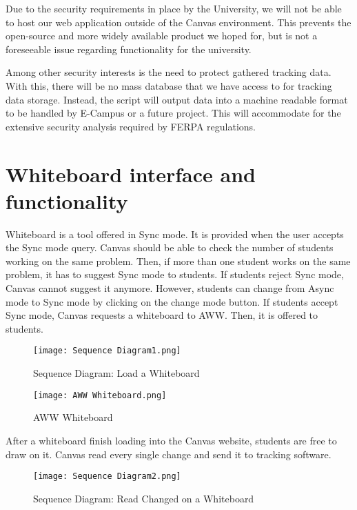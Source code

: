 \documentclass[onecolumn, draftclsnofoot,10pt, compsoc]{IEEEtran}
\begin{document}
	Due to the security requirements in place by the University, we will not be able to host our web application outside of the Canvas environment. This prevents the open-source and more widely available product we hoped for, but is not a foreseeable issue regarding functionality for the university.

	Among other security interests is the need to protect gathered tracking data. With this, there will be no mass database that we have access to for tracking data storage. Instead, the script will output data into a machine readable format to be handled by E-Campus or a future project. This will accommodate for the extensive security analysis required by FERPA regulations.


\section{Whiteboard interface and functionality}

	Whiteboard is a tool offered in Sync mode. It is provided when the user accepts the Sync mode query. Canvas should be able to check the number of students working on the same problem. Then, if more than one student works on the same problem, it has to suggest Sync mode to students. If students reject Sync mode, Canvas cannot suggest it anymore. However, students can change from Async mode to Sync mode by clicking on the change mode button. If students accept Sync mode, Canvas requests a whiteboard to AWW. Then, it is offered to students.

	\begin{figure}[H]
		\begin{center}
			\caption{Sequence Diagram: Load a Whiteboard}
			\texttt{[image: Sequence Diagram1.png]}
		\end{center}
	\end{figure}

	\begin{figure}[H]
		\begin{center}
		\caption{AWW Whiteboard}
			\texttt{[image: AWW Whiteboard.png]}
		\end{center}
	\end{figure}

	After a whiteboard finish loading into the Canvas website, students are free to draw on it. Canvas read every single change and send it to tracking software.

	\begin{figure}[H]
		\begin{center}
			\caption{Sequence Diagram: Read Changed on a Whiteboard}
			\texttt{[image: Sequence Diagram2.png]}
		\end{center}
	\end{figure}
\end{document}
